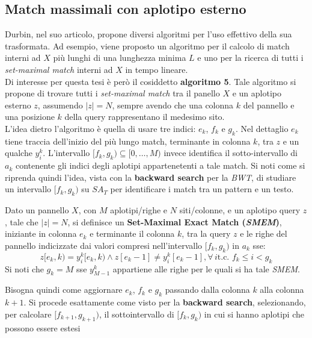 \subsection{Match massimali con aplotipo esterno}
Durbin, nel suo articolo, propone diversi algoritmi per l'uso effettivo della
sua trasformata. Ad esempio, viene proposto un algoritmo per il calcolo
di match interni ad $X$ più lunghi di una lunghezza minima $L$ e uno per la
ricerca di tutti i \textit{set-maximal match} interni ad $X$ in tempo lineare.\\
Di interesse per questa tesi è però il cosiddetto \textbf{algoritmo 5}. Tale
algoritmo 
si propone di trovare tutti i \textit{set-maximal match} tra il panello $X$ e un
aplotipo esterno $z$, assumendo $|z|=N$, sempre avendo che una colonna $k$ del
pannello e una posizione $k$ della query rappresentano il medesimo sito.\\ 
L'idea dietro l'algoritmo è quella di usare tre indici: $e_k$, $f_k$ e
$g_k$. Nel dettaglio $e_k$ tiene traccia dell'inizio del più lungo match,
terminante in colonna $k$, tra $z$ e un qualche $y_i^k$. L'intervallo
$[f_k,g_k)\subseteq[0,\ldots,M)$ invece identifica il sotto-intervallo di
$a_k$ contenente gli indici degli aplotipi appartenetenti a tale match. Si noti
come si riprenda quindi l'idea, vista con la \textbf{backward search} per la
\textit{BWT}, di studiare un intervallo $[f_k,g_k)$ su $SA_T$ per identificare i
match tra un pattern e un testo. 
\begin{definizione}
  Dato un pannello $X$, con $M$ aplotipi/righe e $N$ siti/colonne, e un aplotipo
  query $z$, tale che $|z|=N$, si definisce un \textbf{Set-Maximal Exact Match
    (\textit{SMEM})}, iniziante in colonna $e_k$ e terminante il colonna
  $k$, tra 
  la query $z$ e le righe del pannello indicizzate dai valori compresi
  nell'intervallo $[f_k,g_k)$ in $a_k$ sse:
  \begin{equation}
    \label{eq:pbwtsmem}
    z[e_k,k)=y_i^k[e_k,k)\land z[e_k-1]\neq y_i^k[e_k-1], \forall\, i\mbox{
      t.c. }f_k\leq i < g_k
  \end{equation}
  Si noti che $g_k=M$ sse $y_{M-1}^k$ appartiene alle righe per le quali si ha
  tale \textit{SMEM}.
\end{definizione}
Bisogna quindi come aggiornare $e_k$, $f_k$ e $g_k$ passando dalla
colonna $k$ alla colonna $k+1$. Si procede esattamente come visto per la
\textbf{backward search}, selezionando, per calcolare  $[f_{k+1},g_{k+1})$, il
sottointervallo di $[f_k,g_k)$ in cui si hanno aplotipi che possono essere estesi
